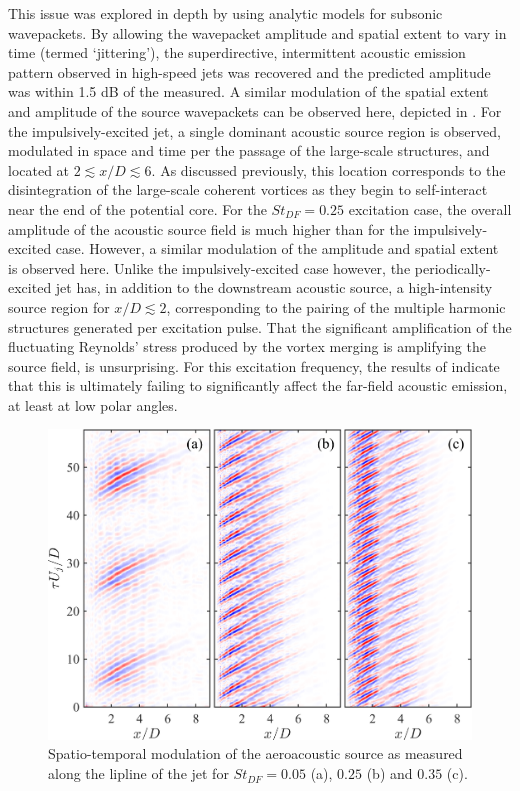 This issue was explored in depth by \citet{Cavalieri2010} using analytic models for subsonic wavepackets.
By allowing the wavepacket amplitude and spatial extent to vary in time (termed `jittering'), the superdirective, intermittent acoustic emission pattern observed in high-speed jets was recovered and the predicted amplitude was within 1.5 dB of the measured.
A similar modulation of the spatial extent and amplitude of the source wavepackets can be observed here, depicted in .
For the impulsively-excited jet, a single dominant acoustic source region is observed, modulated in space and time per the passage of the large-scale structures, and located at $ 2 \lesssim x/D \lesssim 6$.
As discussed previously, this location corresponds to the disintegration of the large-scale coherent vortices as they begin to self-interact near the end of the potential core.
For the $St_{DF} = 0.25$ excitation case, the overall amplitude of the acoustic source field is much higher than for the impulsively-excited case.
However, a similar modulation of the amplitude and spatial extent is observed here.
Unlike the impulsively-excited case however, the periodically-excited jet has, in addition to the downstream acoustic source, a high-intensity source region  for $x/D \lesssim 2$, corresponding to the pairing of the multiple harmonic structures generated per excitation pulse.
That the significant amplification of the fluctuating Reynolds' stress produced by the vortex merging is amplifying the source field, is unsurprising.
For this excitation frequency, the results of  indicate that this is ultimately failing to significantly affect the far-field acoustic emission, at least at low polar angles.
\begin{figure}
	\centering
	\includegraphics[width=0.9\linewidth]{Figures/sect_acoustic_source_modulated_source.png}
	\caption{Spatio-temporal modulation of the aeroacoustic source as measured along the lipline of the jet for $St_{DF} = 0.05$ (a), $0.25$ (b) and $0.35$ (c).}
	\label{fig:jittering}
\end{figure}

